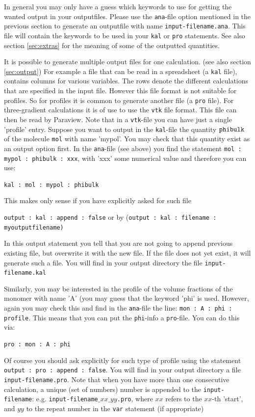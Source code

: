 \documentclass{article}
\begin{document}
In general you may only have a guess which keywords to use for getting the wanted output in your outputfiles. Please use the  {\tt ana}-file option mentioned in the previous section to generate an outputfile with name {\tt input-filename.ana}. This file will contain the keywords to be used in your {\tt kal} or {\tt pro} statements. See also section \ref{sec:extras} for the meaning of some of the outputted quantities. 

It is possible to generate multiple output files for one calculation. (see also section \ref{sec:output})  For example a file that can be read in a spreadsheet (a {\tt kal} file), contains columns for various variables.  The rows denote the different calculations that are specified in the input file.  However this file format is not suitable for profiles.  So for profiles it is common to generate another file (a {\tt pro} file).  For three-gradient calculations it is of use to use the {\tt vtk} file format. This file can then be read by Paraview. Note that in a {\tt vtk}-file you can have just a single 'profile' entry.  
Suppose you want to output in the {\tt kal}-file the quantity $\tt phibulk$ of the molecule {\tt mol} with name 'mypol'. You may check that this quantity exist as an output option first. In the {\tt ana}-file (see above) you find the statement {\tt mol : mypol : phibulk : xxx}, with 'xxx' some numerical value and therefore you can use: 

{\tt kal : mol : mypol : phibulk }

\noindent This makes only sense if you have explicitly asked for such file
 
 {\tt output : kal : append : false} or by (\tt output : kal : filename : myoutputfilename)
 
 \noindent In this output statement you tell that you are not going to append previous existing file, but overwrite it with the new file. If the file does not yet exist, it will generate such a file. You will find in your output directory the file {\tt input-filename.kal}

 Similarly, you may be interested in the profile of the volume fractions of the monomer with name 'A' (you may guess that the keyword 'phi' is used. However, again you may check this and find in the {\tt ana}-file the line: {\tt mon : A : phi : profile}. This means that you can put the {\tt phi}-info a {\tt pro}-file. You can do this via:

 {\tt pro : mon : A : phi}

 Of course you should ask explicitly for such type of profile using the statement {\tt output : pro : append : false}. You will find in your output directory a file {\tt input-filename.pro}. Note that when you have more than one consecutive calculation, a unique (set of numbers) number is appended to the {\tt input-filename}: e.g. {\tt input-filename$\_xx\_yy$.pro}, where $xx$ refers to the $xx$-th 'start', and $yy$ to the repeat number in the {\tt var} statement (if appropriate) 
\end{document}
